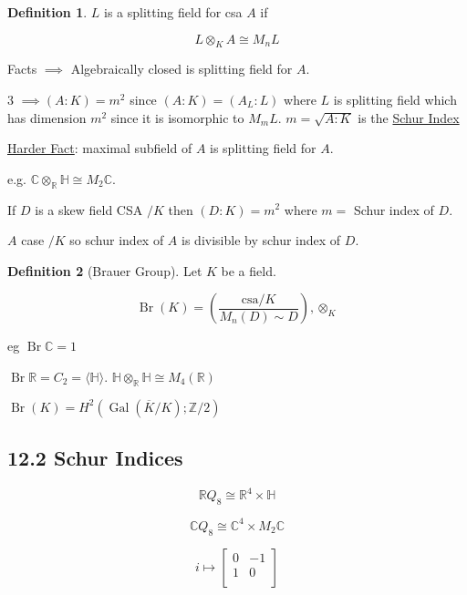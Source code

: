 \documentclass{article}
\theoremstyle{definition}
\newtheorem*{definition}{Definition}
\begin{document}
\begin{definition}
    \(L\) is a splitting field for csa \(A\) if

    \[
        L \otimes_K A \cong M_n L
    \]
\end{definition}


Facts \(\implies\) Algebraically closed is splitting field for \(A\).

3 \(\implies (A:K) = m^2\) since \((A:K) = (A_L : L)\) where \(L\) is splitting field which has dimension \(m^2\) since it is isomorphic to \(M_m L\). \(m = \sqrt{A:K} \) is the \underline{Schur Index} 

\underline{Harder Fact}: maximal subfield of \(A\) is splitting field for \(A\).

e.g. \(\mathbb{C} \otimes _\mathbb{R} \mathbb{H} \cong M_2\mathbb{C}\).

If \(D\) is a skew field CSA \(/ K\) then \((D:K) = m^2\) where \(m =\) Schur index of \(D\).

\(A\) case \(/ K\) so schur index of \(A\) is divisible by schur index of \(D\).

\begin{definition}
    [Brauer Group] Let \(K\) be a field.

    \[
        \operatorname{Br}(K) = \left( \frac{\text{csa} / K}{M_n(D) \sim D} \right) , \otimes_K
    \]
\end{definition}

eg \(\operatorname{Br} \mathbb{C} = 1\) 

\(\operatorname{Br}\mathbb{R} = C_2 = \langle \mathbb{H} \rangle \). \(\mathbb{H} \otimes_\mathbb{R} \mathbb{H} \cong M_4(\mathbb{R})\)

\(\operatorname{Br}(K) = H^2 (\operatorname{Gal}(\overline{K} / K); \mathbb{Z} / 2)\) 

\subsection*{12.2 Schur Indices}

\[
    \mathbb{R} Q_8 \cong \mathbb{R}^4 \times \mathbb{H} 
\]

\[
    \mathbb{C} Q_8 \cong \mathbb{C}^4 \times M_2\mathbb{C}
\]

\[
    i \mapsto \begin{bmatrix}
        0 &  -1 \\
        1 &  0 \\
    \end{bmatrix}
\]
\end{document}
